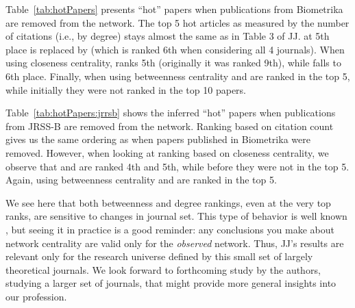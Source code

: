 \documentclass[12pt]{article}
\begin{document}
Table~\ref{tab:hotPapers} presents ``hot'' papers when publications from Biometrika are removed from the network.  The top 5 hot articles as measured by the number of citations (i.e., by degree) stays
almost the same as in Table 3 of JJ. \cite{zou2005regularization} at
5th place is replaced by \cite{Genovese2004stochastic} (which is
ranked 6th when considering all 4 journals). When using
closeness centrality, \cite{Meinshausen2006High} ranks 5th (originally
it was ranked 9th), while \cite{Hunter2005Variable} falls to 6th
place.  Finally, when using betweenness centrality
\cite{Bunea2007Aggregation} and \cite{Koltchinskii2006Local} are ranked 
in the top 5, while initially they were not ranked in the top 10 papers.

Table~\ref{tab:hotPapers:jrrsb} shows the inferred ``hot'' papers when publications from JRSS-B are removed from the network. Ranking based on citation count gives
us the same ordering as when papers published in Biometrika were
removed.  However, when looking at ranking based on closeness
centrality, we observe that \cite{Drton2004Multimodality} and
\cite{Drton2004Model} are ranked 4th and 5th, while before they were
not in the top 5. Again, using betweenness centrality
\cite{Bunea2007Aggregation} and \cite{Koltchinskii2006Local} are
ranked in the top 5.

We see here that both betweenness and degree rankings, even at the very top ranks, are sensitive  to changes in journal set.  This type of behavior is well known
\citep[e.g.,][]{Borgatti2006robustness}, but seeing it in practice is a good reminder: any conclusions you make about network centrality are  valid only for the {\it observed} network.   Thus, JJ's results are relevant only for the research universe defined by this small set of largely theoretical journals. We look forward to forthcoming
study by the authors, studying a larger set of journals, that might provide more general insights into our
profession.








\small


\end{document}
